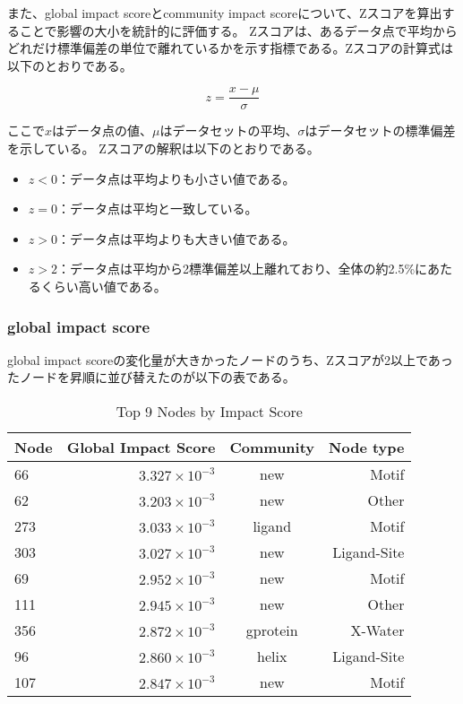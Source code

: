 また、global impact scoreとcommunity impact scoreについて、Zスコアを算出することで影響の大小を統計的に評価する。
Zスコアは、あるデータ点で平均からどれだけ標準偏差の単位で離れているかを示す指標である。Zスコアの計算式は以下のとおりである。

\begin{equation}
z = \frac{x - \mu}{\sigma}
\end{equation}

ここで$x$はデータ点の値、$\mu$はデータセットの平均、$\sigma$はデータセットの標準偏差を示している。
Zスコアの解釈は以下のとおりである。
\begin{itemize}
    \item \( z < 0 \)：データ点は平均よりも小さい値である。
    \item \( z = 0 \)：データ点は平均と一致している。
    \item \( z > 0 \)：データ点は平均よりも大きい値である。
    \item \( z > 2 \)：データ点は平均から2標準偏差以上離れており、全体の約2.5\%にあたるくらい高い値である。
\end{itemize}

\subsubsection{global impact score}
global impact scoreの変化量が大きかったノードのうち、Zスコアが2以上であったノードを昇順に並び替えたのが以下の表である。
\begin{table}[ht]
    \centering
    \begin{tabular}{|l|r|c|r|}
    \hline
    \textbf{Node} & \textbf{Global Impact Score} & \textbf{Community} & \textbf{Node type}\\
    \hline
    66 & \( 3.327 \times 10^{-3} \) & new & Motif \\
    62 & \( 3.203 \times 10^{-3} \) & new & Other \\
    273 & \( 3.033 \times 10^{-3} \) & ligand & Motif \\
    303 & \( 3.027 \times 10^{-3} \) & new & Ligand-Site \\
    69 & \( 2.952 \times 10^{-3} \) & new & Motif \\
    111 & \( 2.945 \times 10^{-3} \) & new & Other \\
    356 & \( 2.872 \times 10^{-3} \) & gprotein & X-Water \\
    96 & \( 2.860 \times 10^{-3} \) & helix & Ligand-Site \\
    107 & \( 2.847 \times 10^{-3} \) & new & Motif \\
    \hline
    \end{tabular}
    \caption{Top 9 Nodes by Impact Score}
\end{table}

